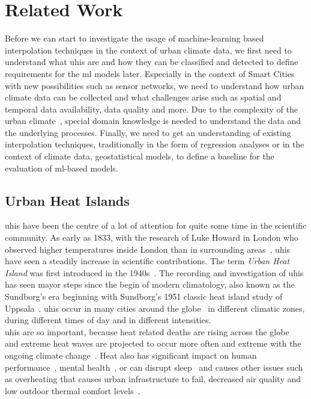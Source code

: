 \chapter{Related Work}
\label{chap:Related Work}

Before we can start to investigate the usage of machine-learning based interpolation techniques in the context of urban climate data, we first need to understand what \gls{uhi}s are and how they can be classified and detected to define requirements for the \gls{ml} models later. Especially in the context of Smart Cities with new possibilities such as sensor networks, we need to understand how urban climate data can be collected and what challenges arise such as spatial and temporal data availability, data quality and more. Due to the complexity of the urban climate~\cite{oke2006guideline}, special domain knowledge is needed to understand the data and the underlying processes.
Finally, we need to get an understanding of existing interpolation techniques, traditionally in the form of regression analyses or in the context of climate data, geostatistical models, to define a baseline for the evaluation of \gls{ml}-based models.

\section{Urban Heat Islands}

\gls{uhi}s have been the centre of a lot of attention for quite some time in the scientific community. As early as 1833, with the research of Luke Howard in London who observed higher temperatures inside London than in surrounding areas~\cite{howard1833climate}, \gls{uhi}s have seen a steadily increase in scientific contributions. The term \textit{Urban Heat Island} was first introduced in the 1940s~\cite{balchin1947micro}. The recording and investigation of \gls{uhi}s has seen mayor steps since the begin of modern climatology, also known as the Sundborg's era beginning with Sundborg's 1951 classic heat island study of Uppsala~\cite{sundborg1951climatological}. \gls{uhi}s occur in many cities around the globe~\cite{peng2012surface} in different climatic zones, during different times of day and in different intensities.\\
\gls{uhi}s are so important, because heat related deaths are rising across the globe~\cite{kovats2008heat} and extreme heat waves are projected to occur more often and extreme with the ongoing climate change~\cite{lorenz2019detection}. Heat also has significant impact on human performance~\cite{kjellstrom2016heat}, mental health~\cite{obradovich2018empirical}, or can disrupt sleep~\cite{obradovich2017nighttime} and causes other issues such as overheating that causes urban infrastructure to fail, decreased air quality and low outdoor thermal comfort levels~\cite{stone2013climate}.

